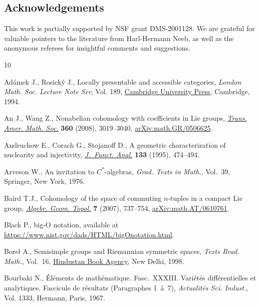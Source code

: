 \documentclass[10pt,a4paper]{amsart}
\numberwithin{equation}{section}
\begin{document}
\subsection*{Acknowledgements}

This work is partially supported by NSF grant DMS-2001128.
We are grateful for valuable pointers to the literature from Harl-Hermann Neeb, as well as the anonymous referees for insightful comments and suggestions.


\begin{thebibliography}{10}
\footnotesize\itemsep=0pt

Ad\'amek J., Rosick\'y J., Locally presentable and accessible categories,
 \textit{London Math. Soc. Lecture Note Ser}, Vol. 189, \href{https://doi.org/10.1017/CBO9780511600579}{Cambridge University
 Press}, Cambridge, 1994.

An J., Wang Z., Nonabelian cohomology with coefficients in {L}ie groups,
 \href{https://doi.org/10.1090/S0002-9947-08-04278-5}{\textit{Trans. Amer. Math. Soc.}} \textbf{360} (2008), 3019--3040,
 \href{https://arxiv.org/abs/math.GR/0506625}{arXiv:math.GR/0506625}.

Andruchow E., Corach G., Stojanoff D., A geometric characterization of
 nuclearity and injectivity, \href{https://doi.org/10.1006/jfan.1995.1134}{\textit{J.~Funct. Anal.}} \textbf{133} (1995),
 474--494.

Arveson W., An invitation to {$C^*$}-algebras, \textit{Grad. Texts in Math.},
 Vol.~39, Springer, New York, 1976.

Baird T.J., Cohomology of the space of commuting {$n$}-tuples in a compact
 {L}ie group, \href{https://doi.org/10.2140/agt.2007.7.737}{\textit{Algebr. Geom. Topol.}} \textbf{7} (2007), 737--754,
 \href{https://arxiv.org/abs/math.AT/0610761}{arXiv:math.AT/0610761}.

Black P., big-{O} notation, available at
 \url{https://www.nist.gov/dads/HTML/bigOnotation.html}.

Borel A., Semisimple groups and {R}iemannian symmetric spaces, \textit{Texts
 Read. Math.}, Vol.~16, \href{https://doi.org/10.1007/978-93-80250-92-2}{Hindustan Book Agency}, New Delhi, 1998.

Bourbaki N., \'El\'ements de math\'ematique. {F}asc.~{XXXIII}. {V}ari\'et\'es
 diff\'erentielles et analytiques. {F}ascicule de r\'esultats ({P}aragraphes
 1~\`a~7), \textit{Actualit\'es Sci. Indust.}, Vol. 1333, Hermann, Paris,
 1967.


\end{thebibliography}
\end{document}

